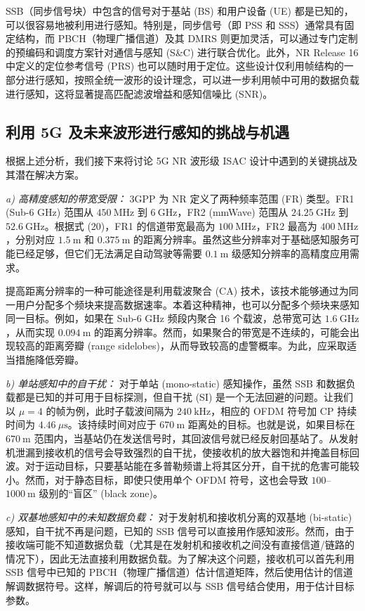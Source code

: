 SSB（同步信号块）中包含的信号对于基站 (BS) 和用户设备 (UE) 都是已知的，可以很容易地被利用进行感知。特别是，同步信号（即 PSS 和 SSS）通常具有固定结构，而 PBCH（物理广播信道）及其 DMRS 则更加灵活，可以通过专门定制的预编码和调度方案针对通信与感知 (S\&C) 进行联合优化。此外，NR Release 16 中定义的定位参考信号 (PRS) 也可以随时用于定位。这些设计仅利用帧结构的一部分进行感知，按照全统一波形的设计理念，可以进一步利用帧中可用的数据负载进行感知，这将显著提高匹配滤波增益和感知信噪比 (SNR)。

\subsection{利用 5G 及未来波形进行感知的挑战与机遇}

根据上述分析，我们接下来将讨论 5G NR 波形级 ISAC 设计中遇到的关键挑战及其潜在解决方案。

\textit{a) 高精度感知的带宽受限：} 3GPP 为 NR 定义了两种频率范围 (FR) 类型。FR1 (Sub-6 GHz) 范围从 $450~\text{MHz}$ 到 $6~\text{GHz}$，FR2 (mmWave) 范围从 $24.25~\text{GHz}$ 到 $52.6~\text{GHz}$。根据式 (20)，FR1 的信道带宽最高为 $100~\text{MHz}$，FR2 最高为 $400~\text{MHz}$，分别对应 $1.5~\text{m}$ 和 $0.375~\text{m}$ 的距离分辨率。虽然这些分辨率对于基础感知服务可能已经足够，但它们无法满足自动驾驶等需要 $0.1~\text{m}$ 级感知分辨率的高精度应用需求。

提高距离分辨率的一种可能途径是利用载波聚合 (CA) 技术，该技术能够通过为同一用户分配多个频块来提高数据速率。本着这种精神，也可以分配多个频块来感知同一目标。例如，如果在 Sub-6 GHz 频段内聚合 16 个载波，总带宽可达 $1.6~\text{GHz}$，从而实现 $0.094~\text{m}$ 的距离分辨率。然而，如果聚合的带宽是不连续的，可能会出现较高的距离旁瓣 (range sidelobes)\cite{7096298}，从而导致较高的虚警概率。为此，应采取适当措施降低旁瓣。

\textit{b) 单站感知中的自干扰：} 对于单站 (mono-static) 感知操作，虽然 SSB 和数据负载都是已知的并可用于目标探测，但自干扰 (SI) 是一个无法回避的问题。让我们以 $\mu=4$ 的帧为例，此时子载波间隔为 $240~\text{kHz}$，相应的 OFDM 符号加 CP 持续时间为 $4.46~\mu\text{s}$。该持续时间对应于 $670~\text{m}$ 距离处的目标。也就是说，如果目标在 $670~\text{m}$ 范围内，当基站仍在发送信号时，其回波信号就已经反射回基站了。从发射机泄漏到接收机的信号会导致强烈的自干扰，使接收机的放大器饱和并掩盖目标回波。对于运动目标，只要基站能在多普勒频谱上将其区分开，自干扰的危害可能较小。然而，对于静态目标，即使只使用单个 OFDM 符号，这也会导致 $100$--$1000~\text{m}$ 级别的“盲区” (black zone)。

\textit{c) 双基地感知中的未知数据负载：} 对于发射机和接收机分离的双基地 (bi-static) 感知，自干扰不再是问题，已知的 SSB 信号可以直接用作感知波形。然而，由于接收端可能不知道数据负载（尤其是在发射机和接收机之间没有直接信道/链路的情况下），因此无法直接利用数据负载。为了解决这个问题，接收机可以首先利用 SSB 信号中已知的 PBCH（物理广播信道）估计信道矩阵，然后使用估计的信道解调数据符号。这样，解调后的符号就可以与 SSB 信号结合使用，用于估计目标参数。